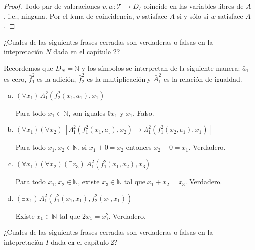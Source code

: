 \begin{proof}
Todo par de valoraciones $v, w : \mathscr T \to D_I$ coincide en las variables libres de $A$, i.e., ninguna. Por el lema de coincidencia, $v$ satisface $A$ si y sólo si $w$ satisface $A$.
\end{proof}

\setcounter{exercise}{15}
\begin{exercise}
¿Cuales de las siguientes frases cerradas son verdaderas o falsas en la intepretación $N$ dada en el capítulo 2?
\end{exercise}

\begin{remark}
Recordemos que $D_N = \mathbb N$ y los símbolos se interpretan de la siguiente manera: $\bar a_1$ es cero, $\bar f_1^2$ es la adición, $\bar f_2^2$ es la multiplicación y $\bar A_1^2$ es la relación de igualdad.
\end{remark}

\begin{enumerate}[(a)]
    \item $(\forall x_1) \, A_1^2(f_2^2(x_1, a_1), x_1)$
    \begin{solution}
    Para todo $x_1 \in \mathbb N$, son iguales $0x_1$ y $x_1$. Falso.
    \end{solution}
    
    \item $(\forall x_1) (\forall x_2) \, [A_1^2(f_1^2(x_1, a_1), x_2) \to A_1^2(f_1^2(x_2, a_1), x_1)]$
    \begin{solution}
    Para todo $x_1, x_2 \in \mathbb N$, si $x_1 + 0 = x_2$ entonces $x_2 + 0 = x_1$. Verdadero.
    \end{solution}
    
    \item $(\forall x_1) (\forall x_2) (\exists x_3) \, A_1^2(f_1^2(x_1, x_2), x_3)$
    \begin{solution}
    Para todo $x_1, x_2 \in \mathbb N$, existe $x_3 \in \mathbb N$ tal que $x_1 + x_2 = x_3$. Verdadero.
    \end{solution}
    
    \item $(\exists x_1) \, A_1^2(f_1^2(x_1, x_1), f_2^2(x_1, x_1))$
    \begin{solution}
    Existe $x_1 \in \mathbb N$ tal que $2x_1 = x_1^2$. Verdadero.
    \end{solution}
\end{enumerate}

\begin{exercise}
¿Cuales de las siguientes frases cerradas son verdaderas o falsas en la intepretación $I$ dada en el capítulo 2?
\end{exercise}


